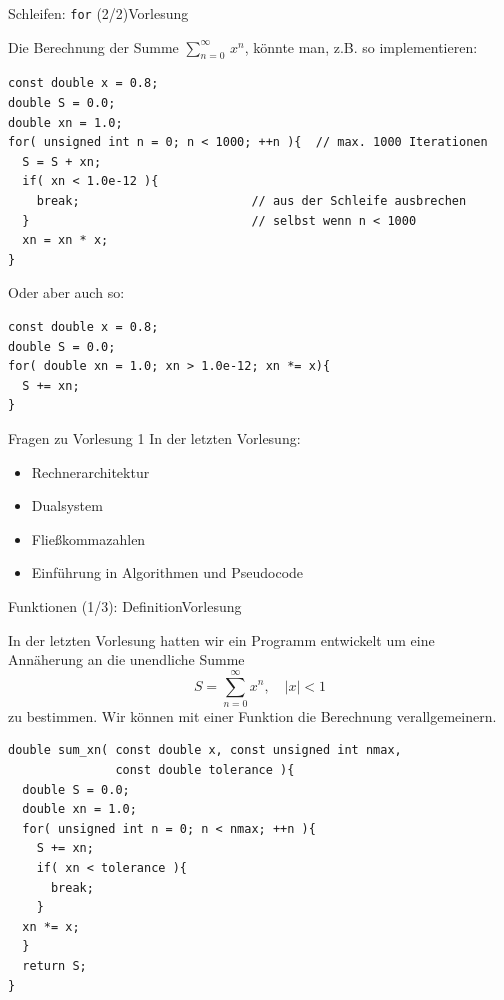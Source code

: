 \documentclass[xcolor=dvipsnames]{beamer}
\newcounter{lecturecounter}
\begin{document}
\begin{frame}[fragile]{Schleifen: \texttt{for} (2/2)}{Vorlesung }
\begin{block}{}
Die Berechnung der Summe $\sum_{n=0}^{\infty} \, x^n$, könnte man, z.B. so implementieren:
\end{block}
\begin{lstlisting}
const double x = 0.8;
double S = 0.0;
double xn = 1.0;
for( unsigned int n = 0; n < 1000; ++n ){  // max. 1000 Iterationen
  S = S + xn;
  if( xn < 1.0e-12 ){
    break;                        // aus der Schleife ausbrechen
  }                               // selbst wenn n < 1000
  xn = xn * x;
}
\end{lstlisting}

\begin{block}{}
Oder aber auch so:
\end{block}
\begin{lstlisting}
const double x = 0.8;
double S = 0.0;
for( double xn = 1.0; xn > 1.0e-12; xn *= x){
  S += xn;
}
\end{lstlisting}
\end{frame}


\begin{frame}{Fragen zu Vorlesung 1}
  In der letzten Vorlesung:
  \begin{itemize}
    \item{Rechnerarchitektur}
    \item{Dualsystem}
    \item{Fließkommazahlen}
    \item{Einführung in Algorithmen und Pseudocode}
  \end{itemize}

\end{frame}


\begin{frame}[fragile]{Funktionen (1/3): Definition}{Vorlesung }
\begin{block}{}
In der letzten Vorlesung hatten wir ein Programm entwickelt um eine Annäherung an die unendliche Summe
\begin{equation*}
  S=\sum_{n=0}^\infty x^n, \quad |x| < 1
\end{equation*}
zu bestimmen. Wir können mit einer Funktion die Berechnung verallgemeinern.
\end{block}
\begin{lstlisting}
double sum_xn( const double x, const unsigned int nmax, 
               const double tolerance ){
  double S = 0.0;
  double xn = 1.0;
  for( unsigned int n = 0; n < nmax; ++n ){  
    S += xn;
    if( xn < tolerance ){
      break;                        
    }                               
  xn *= x; 
  }
  return S;
}
\end{lstlisting}
\end{frame}
\end{document}
